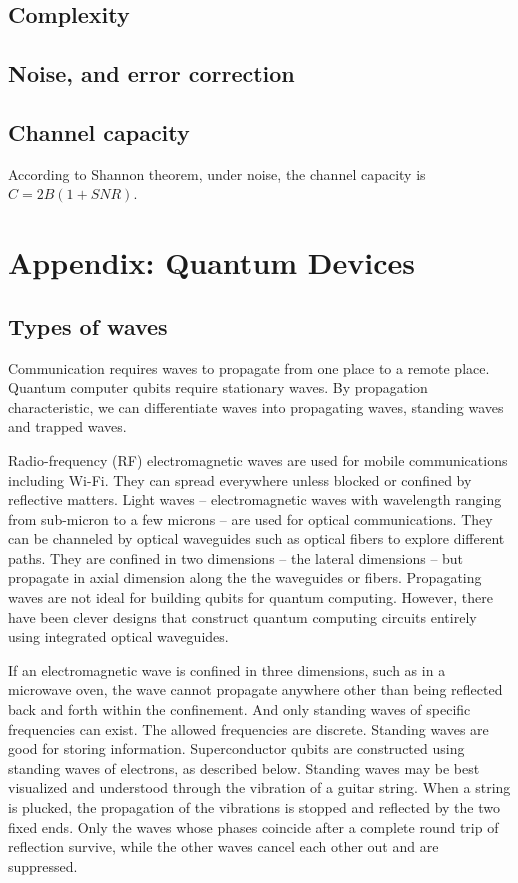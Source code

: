 \documentclass[oneside, letter, 12pt]{book}
\begin{document}
\section{Complexity}

\section{Noise, and error correction}
\section{Channel capacity}
According to Shannon theorem, under noise, the channel capacity is $C = 2B (1+SNR)$.

\chapter*{Appendix: Quantum Devices}\label{A-qubit}
\section{Types of waves}
Communication requires waves to propagate from one place to a remote place. Quantum computer qubits require stationary waves. By propagation characteristic, we can differentiate waves into propagating waves, standing waves and trapped waves.

Radio-frequency (RF) electromagnetic waves are used for mobile communications including Wi-Fi. They can spread everywhere unless blocked or confined by reflective matters. Light waves -- electromagnetic waves with wavelength ranging from sub-micron to a few microns -- are used for optical communications. They can be channeled by optical waveguides such as optical fibers to explore different paths. They are confined in two dimensions -- the lateral dimensions -- but propagate in axial dimension along the the waveguides or fibers. Propagating waves are not ideal for building qubits for quantum computing. However, there have been clever designs that construct quantum computing circuits entirely using integrated optical waveguides.

If an electromagnetic wave is confined in three dimensions, such as in a microwave oven, the wave cannot propagate anywhere other than being reflected back and forth within the confinement. And only standing waves of specific frequencies can exist. The allowed frequencies are discrete. Standing waves are good for storing information. Superconductor qubits are constructed using standing waves of electrons, as described below. Standing waves may be best visualized and understood through the vibration of a guitar string. When a string is plucked, the propagation of the vibrations is stopped and reflected by the two fixed ends. Only the waves whose phases coincide after a complete round trip of reflection survive, while the other waves cancel each other out and are suppressed.
\end{document}
